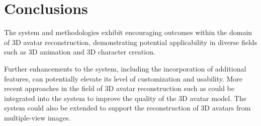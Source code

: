 \section{Conclusions}\label{sec:conclusions}

The system and methodologies exhibit encouraging outcomes within the domain of 3D avatar reconstruction, demonstrating potential applicability in diverse fields such as 3D animation and 3D character creation. 

Further enhancements to the system, including the incorporation of additional features, can potentially elevate its level of customization and usability. More recent approaches in the field of 3D avatar reconstruction such as  could be integrated into the system to improve the quality of the 3D avatar model. The system could also be extended to support the reconstruction of 3D avatars from multiple-view images.